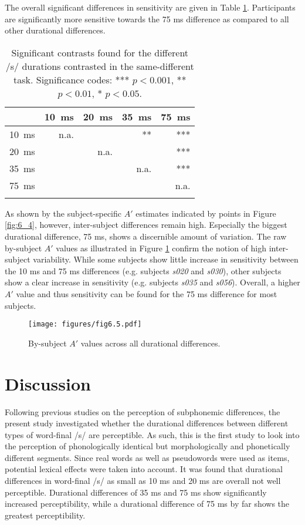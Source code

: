 The overall significant differences in sensitivity are given in Table \ref{tab:6.12}. Participants are significantly more sensitive towards the 75 ms difference as compared to all other durational differences. 

\begin{table}\fontsize{10}{11}
\caption{Significant contrasts found for the different /s/ durations contrasted in the same-different task. Significance codes: *** $p < 0.001$, ** $p < 0.01$, * $p < 0.05$.}
\label{tab:6.12}
\centering
\begin{tabular}{lrrrr} 
\lsptoprule
\textbf{~} & 10~ms & 20~ms & 35~ms & 75~ms  \\ 
\midrule
10~ms      & n.a.  & ~     & **    & ***    \\
20~ms      & ~     & n.a.  & ~     & ***    \\
35~ms      & ~     & ~     & n.a.  & ***    \\
75~ms      & ~     & ~     & ~     & n.a.   \\
\lspbottomrule
\end{tabular}
\end{table}

As shown by the subject-specific $A'$ estimates indicated by points in Figure \ref{fig:6_4}, however, inter-subject differences remain high. Especially the biggest durational difference, 75 ms, shows a discernible amount of variation. The raw by-subject $A'$ values as illustrated in Figure \ref{fig:6_5} confirm the notion of high inter-subject variability. While some subjects show little increase in sensitivity between the 10 ms and 75 ms differences (e.g. subjects \textit{s020} and \textit{s030}), other subjects show a clear increase in sensitivity (e.g. subjects \textit{s035} and \textit{s056}). Overall, a higher $A'$ value and thus sensitivity can be found for the 75 ms difference for most subjects.

\begin{figure}
    \centering
    \texttt{[image: figures/fig6.5.pdf]}
    \caption{By-subject $A'$ values across all durational differences.}
    \label{fig:6_5}
\end{figure}

\section{Discussion}\label{section06_4}

Following previous studies on the perception of subphonemic differences, the present study investigated whether the durational differences between different types of word-final /s/ are perceptible. As such, this is the first study to look into the perception of phonologically identical but morphologically and phonetically different segments. Since real words as well as pseudowords were used as items, potential lexical effects were taken into account. It was found that durational differences in word-final /s/ as small as 10 ms and 20 ms are overall not well perceptible. Durational differences of 35 ms and 75 ms show significantly increased perceptibility, while a durational difference of 75 ms by far shows the greatest perceptibility.

